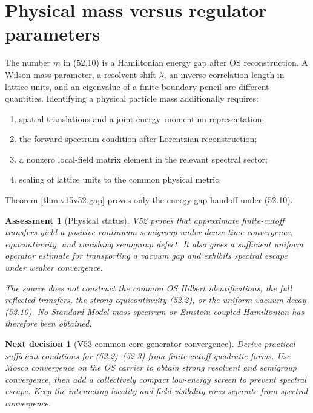 \documentclass[11pt]{article}
\newtheorem{decision}[theorem]{Next decision}
\newtheorem{assessment}[theorem]{Assessment}
\theoremstyle{remark}
\begin{document}
\section{Physical mass versus regulator parameters}

The number \(m\) in (52.10) is a Hamiltonian energy gap after OS
reconstruction.  A Wilson mass parameter, a resolvent shift
\(\lambda\), an inverse correlation length in lattice units, and an
eigenvalue of a finite boundary pencil are different quantities.
Identifying a physical particle mass additionally requires:
\begin{enumerate}
\item spatial translations and a joint energy--momentum
      representation;
\item the forward spectrum condition after Lorentzian
      reconstruction;
\item a nonzero local-field matrix element in the relevant spectral
      sector;
\item scaling of lattice units to the common physical metric.
\end{enumerate}
Theorem \ref{thm:v15v52-gap} proves only the energy-gap handoff under
(52.10).

\begin{assessment}[Physical status]
\label{ass:v15v52-status}
V52 proves that approximate finite-cutoff transfers yield a positive
continuum semigroup under dense-time convergence, equicontinuity,
and vanishing semigroup defect.  It also gives a sufficient uniform
operator estimate for transporting a vacuum gap and exhibits
spectral escape under weaker convergence.

The source does not construct the common OS Hilbert identifications,
the full reflected transfers, the strong equicontinuity (52.2), or
the uniform vacuum decay (52.10).  No Standard Model mass spectrum
or Einstein-coupled Hamiltonian has therefore been obtained.
\end{assessment}

\begin{decision}[V53 common-core generator convergence]
\label{dec:v15v52-next}
Derive practical sufficient conditions for (52.2)--(52.3) from
finite-cutoff quadratic forms.  Use Mosco convergence on the OS
carrier to obtain strong resolvent and semigroup convergence, then
add a collectively compact low-energy screen to prevent spectral
escape.  Keep the interacting locality and field-visibility rows
separate from spectral convergence.
\end{decision}
\end{document}
